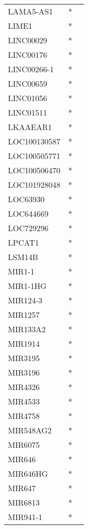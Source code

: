 \begin{longtable}{lcc}
LAMA5-AS1      &  * &         \\
LIME1          &  * &         \\
LINC00029      &  * &         \\
LINC00176      &  * &         \\
LINC00266-1    &  * &         \\
LINC00659      &  * &         \\
LINC01056      &  * &         \\
LINC01511      &  * &         \\
LKAAEAR1       &  * &         \\
LOC100130587   &  * &         \\
LOC100505771   &  * &         \\
LOC100506470   &  * &         \\
LOC101928048   &  * &         \\
LOC63930       &  * &         \\
LOC644669      &  * &         \\
LOC729296      &  * &         \\
LPCAT1         &  * &         \\
LSM14B         &  * &         \\
MIR1-1         &  * &         \\
MIR1-1HG       &  * &         \\
MIR124-3       &  * &         \\
MIR1257        &  * &         \\
MIR133A2       &  * &         \\
MIR1914        &  * &         \\
MIR3195        &  * &         \\
MIR3196        &  * &         \\
MIR4326        &  * &         \\
MIR4533        &  * &         \\
MIR4758        &  * &         \\
MIR548AG2      &  * &         \\
MIR6075        &  * &         \\
MIR646         &  * &         \\
MIR646HG       &  * &         \\
MIR647         &  * &         \\
MIR6813        &  * &         \\
MIR941-1       &  * &         \\

\end{longtable}
